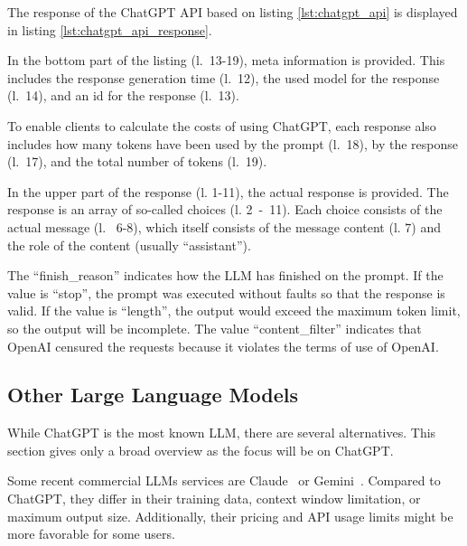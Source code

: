 The response of the ChatGPT \ac{API} based on listing \ref{lst:chatgpt_api} is displayed in listing \ref{lst:chatgpt_api_response}.
 \begin{figure} [htbp!]
 \centering
		\end{figure}

In the bottom part of the listing (l.~13-19), meta information is provided. This includes the response generation time (l.~12), the used model for the response (l.~14), and an id for the response (l.~13).

To enable clients to calculate the costs of using ChatGPT, each response also includes how many tokens have been used by the prompt (l.~18), by the response (l.~17), and the total number of tokens (l.~19).

In the upper part of the response (l. 1-11), the actual response is provided. The response is an array of so-called choices (l. 2~-~11). Each choice consists of the actual message (l.~ 6-8), which itself consists of the message content (l. 7) and the role of the content (usually \enquote{assistant}).

The \enquote{finish\_reason} indicates how the \ac{LLM} has finished on the prompt. If the value is \enquote{stop}, the prompt was executed without faults so that the response is valid. If the value is \enquote{length}, the output would exceed the maximum token limit, so the output will be incomplete. The value \enquote{content\_filter} indicates that OpenAI censured the requests because it violates the terms of use of OpenAI. \cite{ChatGPT_url}


\subsection{Other Large Language Models}\label{sec:other_llm}

While ChatGPT is the most known \ac{LLM}, there are several alternatives. This section gives only a broad overview as the focus will be on ChatGPT.

Some recent commercial \acp{LLM} services are Claude~\cite{claude} or Gemini~\cite{gemini}. Compared to ChatGPT, they differ in their training data, context window limitation, or maximum output size. Additionally, their pricing and API usage limits might be more favorable for some users.

